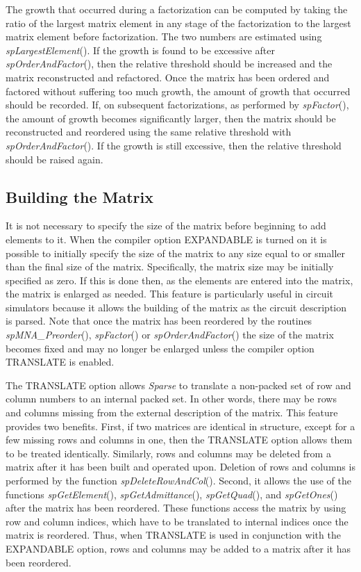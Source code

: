 \documentclass[11pt]{article}
\begin{document}
The growth that occurred during a factorization can be computed by
taking the ratio of the largest matrix element in any stage of the
factorization to the largest matrix element before factorization.  The
two numbers are estimated using \emph{spLargestElement}().  If the growth
is found to be excessive after \emph{spOrderAndFactor}(), then the
relative threshold should be increased and the matrix reconstructed and
refactored.  Once the matrix has been ordered and factored without
suffering too much growth, the amount of growth that occurred should be
recorded.  If, on subsequent factorizations, as performed by
\emph{spFactor}(), the amount of growth becomes significantly larger, then
the matrix should be reconstructed and reordered using the same
relative threshold with \emph{spOrderAndFactor}().  If the growth is still
excessive, then the relative threshold should be raised again.

\subsection{Building the Matrix}
It is not necessary to specify the size of the matrix before beginning
to add elements to it.  When the compiler option EXPANDABLE is turned
on it is possible to initially specify the size of the matrix to any
size equal to or smaller than the final size of the matrix.
Specifically, the matrix size may be initially specified as zero.  If
this is done then, as the elements are entered into the matrix, the
matrix is enlarged as needed.  This feature is particularly useful in
circuit simulators because it allows the building of the matrix as the
circuit description is parsed.  Note that once the matrix has been
reordered by the routines \emph{spMNA\_Preorder}(), \emph{spFactor}() or
\emph{spOrderAndFactor}() the size of the matrix becomes fixed and may no
longer be enlarged unless the compiler option TRANSLATE is enabled.

The TRANSLATE option allows \emph{Sparse} to translate a non-packed set
of row and column numbers to an internal packed set.  In other words,
there may be rows and columns missing from the external description of
the matrix.  This feature provides two benefits.  First, if two
matrices are identical in structure, except for a few missing rows and
columns in one, then the TRANSLATE option allows them to be treated
identically.  Similarly, rows and columns may be deleted from a matrix
after it has been built and operated upon.  Deletion of rows and
columns is performed by the function \emph{spDeleteRowAndCol}().  Second,
it allows the use of the functions \emph{spGetElement}(),
\emph{spGetAdmittance}(), \emph{spGetQuad}(), and \emph{spGetOnes}() after the
matrix has been reordered.  These functions access the matrix by using
row and column indices, which have to be translated to internal indices
once the matrix is reordered.  Thus, when TRANSLATE is used in
conjunction with the EXPANDABLE option, rows and columns may be added
to a matrix after it has been reordered.
\end{document}
